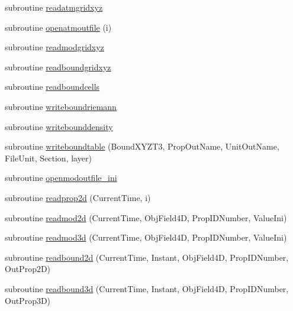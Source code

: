 \begin{DoxyCompactItemize}
\item 
subroutine \mbox{\hyperlink{namespacemoduledelft3d__2__mohid_a8f18a6dd61d1e7402d91d20b87b39b18}{readatmgridxyz}}
\item 
subroutine \mbox{\hyperlink{namespacemoduledelft3d__2__mohid_af28ee3088f02a7a2168e6d5ea6eb97e3}{openatmoutfile}} (i)
\item 
subroutine \mbox{\hyperlink{namespacemoduledelft3d__2__mohid_ac6c4455bd51132eb023e2e4030641dc2}{readmodgridxyz}}
\item 
subroutine \mbox{\hyperlink{namespacemoduledelft3d__2__mohid_a07dc591a7f52b875d18aee392df1d13d}{readboundgridxyz}}
\item 
subroutine \mbox{\hyperlink{namespacemoduledelft3d__2__mohid_abd4423475ad3b1f766d3bfe7af38a4ae}{readboundcells}}
\item 
subroutine \mbox{\hyperlink{namespacemoduledelft3d__2__mohid_a1a45560fe1480c753bc904201b817966}{writeboundriemann}}
\item 
subroutine \mbox{\hyperlink{namespacemoduledelft3d__2__mohid_ae59d00e73feaf12262e517adad081642}{writebounddensity}}
\item 
subroutine \mbox{\hyperlink{namespacemoduledelft3d__2__mohid_a8b7bcfa950bb28feff319224f0ee581e}{writeboundtable}} (Bound\+X\+Y\+Z\+T3, Prop\+Out\+Name, Unit\+Out\+Name, File\+Unit, Section, layer)
\item 
subroutine \mbox{\hyperlink{namespacemoduledelft3d__2__mohid_aa98d814db6ab0cc5e69895b0124b6e95}{openmodoutfile\+\_\+ini}}
\item 
subroutine \mbox{\hyperlink{namespacemoduledelft3d__2__mohid_a34356a964207fa4a212d0973afb377b2}{readprop2d}} (Current\+Time, i)
\item 
subroutine \mbox{\hyperlink{namespacemoduledelft3d__2__mohid_a677f5946463bc1873841fd2e4a910617}{readmod2d}} (Current\+Time, Obj\+Field4D, Prop\+I\+D\+Number, Value\+Ini)
\item 
subroutine \mbox{\hyperlink{namespacemoduledelft3d__2__mohid_aab6512966524b2869edb990481150929}{readmod3d}} (Current\+Time, Obj\+Field4D, Prop\+I\+D\+Number, Value\+Ini)
\item 
subroutine \mbox{\hyperlink{namespacemoduledelft3d__2__mohid_ad65093a68569d902890feaaea9871be5}{readbound2d}} (Current\+Time, Instant, Obj\+Field4D, Prop\+I\+D\+Number, Out\+Prop2D)
\item 
subroutine \mbox{\hyperlink{namespacemoduledelft3d__2__mohid_aae94fb67ed2e5ba83ca3fe0d12490cd4}{readbound3d}} (Current\+Time, Instant, Obj\+Field4D, Prop\+I\+D\+Number, Out\+Prop3D)

\end{DoxyCompactItemize}
